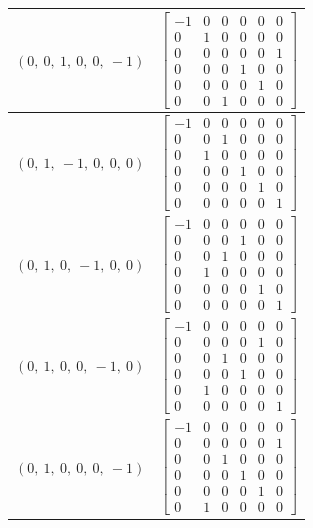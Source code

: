 \documentclass[11pt]{article}
\theoremstyle{definition}
\begin{document}
\begin{longtable}{|l|c|}
    \hline
    $\left( 0, \  0, \  1, \  0, \  0, \  -1\right)$ & ${\left[\begin{matrix}-1 & 0 & 0 & 0 & 0 & 0\\0 & 1 & 0 & 0 & 0 & 0\\0 & 0 & 0 & 0 & 0 & 1\\0 & 0 & 0 & 1 & 0 & 0\\0 & 0 & 0 & 0 & 1 & 0\\0 & 0 & 1 & 0 & 0 & 0\end{matrix}\right]}$ \\
    \hline
    $\left( 0, \  1, \  -1, \  0, \  0, \  0\right)$ & ${\left[\begin{matrix}-1 & 0 & 0 & 0 & 0 & 0\\0 & 0 & 1 & 0 & 0 & 0\\0 & 1 & 0 & 0 & 0 & 0\\0 & 0 & 0 & 1 & 0 & 0\\0 & 0 & 0 & 0 & 1 & 0\\0 & 0 & 0 & 0 & 0 & 1\end{matrix}\right]}$ \\
    \hline
    $\left( 0, \  1, \  0, \  -1, \  0, \  0\right)$ & ${\left[\begin{matrix}-1 & 0 & 0 & 0 & 0 & 0\\0 & 0 & 0 & 1 & 0 & 0\\0 & 0 & 1 & 0 & 0 & 0\\0 & 1 & 0 & 0 & 0 & 0\\0 & 0 & 0 & 0 & 1 & 0\\0 & 0 & 0 & 0 & 0 & 1\end{matrix}\right]}$ \\
    \hline
    $\left( 0, \  1, \  0, \  0, \  -1, \  0\right)$ & ${\left[\begin{matrix}-1 & 0 & 0 & 0 & 0 & 0\\0 & 0 & 0 & 0 & 1 & 0\\0 & 0 & 1 & 0 & 0 & 0\\0 & 0 & 0 & 1 & 0 & 0\\0 & 1 & 0 & 0 & 0 & 0\\0 & 0 & 0 & 0 & 0 & 1\end{matrix}\right]}$ \\
    \hline
    $\left( 0, \  1, \  0, \  0, \  0, \  -1\right)$ & ${\left[\begin{matrix}-1 & 0 & 0 & 0 & 0 & 0\\0 & 0 & 0 & 0 & 0 & 1\\0 & 0 & 1 & 0 & 0 & 0\\0 & 0 & 0 & 1 & 0 & 0\\0 & 0 & 0 & 0 & 1 & 0\\0 & 1 & 0 & 0 & 0 & 0\end{matrix}\right]}$ \\

\end{longtable}
\end{document}
